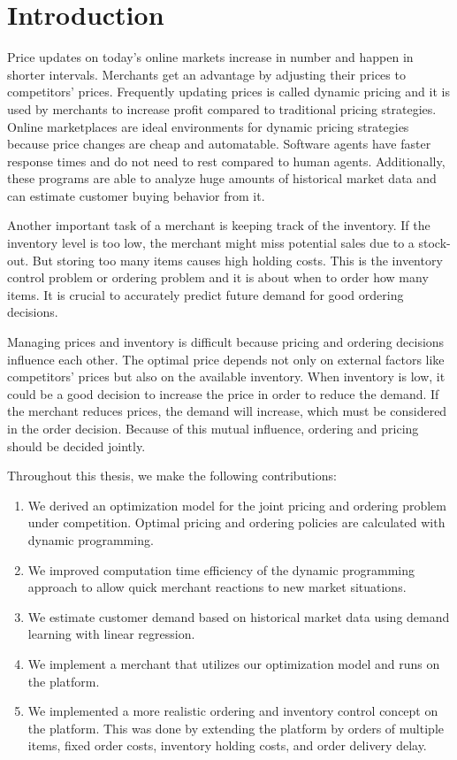 
\chapter{Introduction}
Price updates on today's online markets increase in number and happen in shorter intervals.
Merchants get an advantage by adjusting their prices to competitors' prices.
Frequently updating prices is called dynamic pricing and it is used by merchants to increase profit compared to traditional pricing strategies.
Online marketplaces are ideal environments for dynamic pricing strategies because price changes are cheap and automatable.
Software agents have faster response times and do not need to rest compared to human agents.
Additionally, these programs are able to analyze huge amounts of historical market data and can estimate customer buying behavior from it.

Another important task of a merchant is keeping track of the inventory.
If the inventory level is too low, the merchant might miss potential sales due to a stock-out.
But storing too many items causes high holding costs.
This is the inventory control problem or ordering problem and it is about when to order how many items.
It is crucial to accurately predict future demand for good ordering decisions.

Managing prices and inventory is difficult because pricing and ordering decisions influence each other.
The optimal price depends not only on external factors like competitors' prices but also on the available inventory.
When inventory is low, it could be a good decision to increase the price in order to reduce the demand.
If the merchant reduces prices, the demand will increase, which must be considered in the order decision.
Because of this mutual influence, ordering and pricing should be decided jointly.

Throughout this thesis, we make the following contributions:
\begin{enumerate}
	\item We derived an optimization model for the joint pricing and ordering problem under competition. Optimal pricing and ordering policies are calculated with dynamic programming.
	\item We improved computation time efficiency of the dynamic programming approach to allow quick merchant reactions to new market situations.
	\item We estimate customer demand based on historical market data using demand learning with linear regression.
	\item We implement a merchant that utilizes our optimization model and runs on the  \pricewars platform.
	\item We implemented a more realistic ordering and inventory control concept on the \pricewars platform. This was done by extending the platform by orders of multiple items, fixed order costs, inventory holding costs, and order delivery delay.
\end{enumerate}

